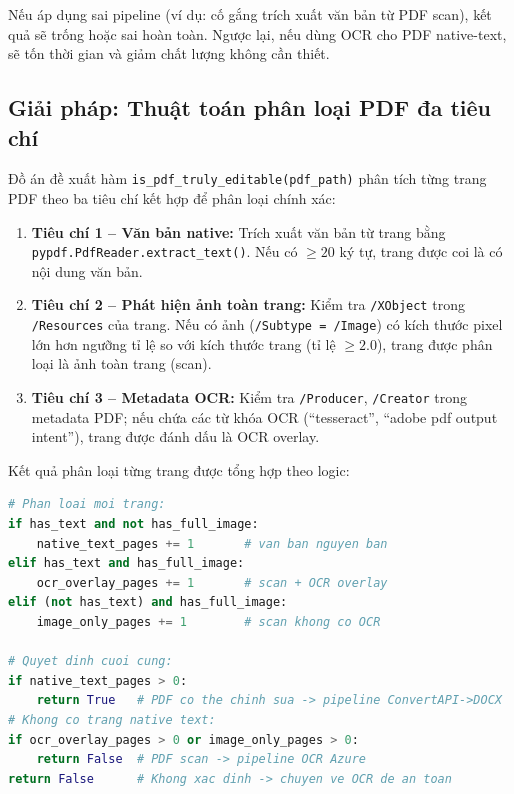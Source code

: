 Nếu áp dụng sai pipeline (ví dụ: cố gắng trích xuất văn bản từ PDF scan), kết quả sẽ trống hoặc
sai hoàn toàn. Ngược lại, nếu dùng OCR cho PDF native-text, sẽ tốn thời gian và giảm chất lượng
không cần thiết.

\subsection{Giải pháp: Thuật toán phân loại PDF đa tiêu chí}

Đồ án đề xuất hàm \texttt{is\_pdf\_truly\_editable(pdf\_path)} phân tích từng trang PDF theo
ba tiêu chí kết hợp để phân loại chính xác:

\begin{enumerate}
  \item \textbf{Tiêu chí 1 -- Văn bản native:} Trích xuất văn bản từ trang bằng
    \texttt{pypdf.PdfReader.extract\_text()}. Nếu có $\geq 20$ ký tự, trang được coi là có
    nội dung văn bản.
  \item \textbf{Tiêu chí 2 -- Phát hiện ảnh toàn trang:} Kiểm tra \texttt{/XObject} trong
    \texttt{/Resources} của trang. Nếu có ảnh (\texttt{/Subtype = /Image}) có kích thước pixel
    lớn hơn ngưỡng tỉ lệ so với kích thước trang (tỉ lệ $\geq 2.0$), trang được phân loại là
    ảnh toàn trang (scan).
  \item \textbf{Tiêu chí 3 -- Metadata OCR:} Kiểm tra \texttt{/Producer}, \texttt{/Creator}
    trong metadata PDF; nếu chứa các từ khóa OCR (``tesseract'', ``adobe pdf output intent''),
    trang được đánh dấu là OCR overlay.
\end{enumerate}

Kết quả phân loại từng trang được tổng hợp theo logic:

\begin{lstlisting}[language=Python, caption={Logic phân loại PDF (translate.py)}]
# Phan loai moi trang:
if has_text and not has_full_image:
    native_text_pages += 1       # van ban nguyen ban
elif has_text and has_full_image:
    ocr_overlay_pages += 1       # scan + OCR overlay
elif (not has_text) and has_full_image:
    image_only_pages += 1        # scan khong co OCR

# Quyet dinh cuoi cung:
if native_text_pages > 0:
    return True   # PDF co the chinh sua -> pipeline ConvertAPI->DOCX
# Khong co trang native text:
if ocr_overlay_pages > 0 or image_only_pages > 0:
    return False  # PDF scan -> pipeline OCR Azure
return False      # Khong xac dinh -> chuyen ve OCR de an toan
\end{lstlisting}

